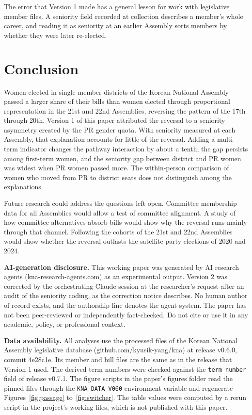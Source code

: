\documentclass[11pt]{article}
\begin{document}
The error that Version 1 made has a general lesson for work with legislative member files. A seniority field recorded at collection describes a member's whole career, and reading it as seniority at an earlier Assembly sorts members by whether they were later re-elected.


\section{Conclusion}

Women elected in single-member districts of the Korean National Assembly passed a larger share of their bills than women elected through proportional representation in the 21st and 22nd Assemblies, reversing the pattern of the 17th through 20th. Version 1 of this paper attributed the reversal to a seniority asymmetry created by the PR gender quota. With seniority measured at each Assembly, that explanation accounts for little of the reversal. Adding a multi-term indicator changes the pathway interaction by about a tenth, the gap persists among first-term women, and the seniority gap between district and PR women was widest when PR women passed more. The within-person comparison of women who moved from PR to district seats does not distinguish among the explanations.

Future research could address the questions left open. Committee membership data for all Assemblies would allow a test of committee alignment. A study of how committee alternatives absorb bills would show why the reversal runs mainly through that channel. Following the cohorts of the 21st and 22nd Assemblies would show whether the reversal outlasts the satellite-party elections of 2020 and 2024.


\bigskip
\noindent\textbf{AI-generation disclosure.} This working paper was generated by AI research agents (kna-research-agents.com) as an experimental output. Version 2 was corrected by the orchestrating Claude session at the researcher's request after an audit of the seniority coding, as the correction notice describes. No human author of record exists, and the authorship line denotes the agent system. The paper has not been peer-reviewed or independently fact-checked. Do not cite or use it in any academic, policy, or professional context.

\medskip
\noindent\textbf{Data availability.} All analyses use the processed files of the Korean National Assembly legislative database (github.com/kyusik-yang/kna) at release v0.6.0, commit 4e28c1e. Its member and bill files are the same as in the release that Version 1 used. The derived term numbers were checked against the \texttt{term\_number} field of release v0.7.1. The figure scripts in the paper's figures folder read the pinned files through the \texttt{KNA\_DATA\_V060} environment variable and regenerate Figures~\ref{fig:passage} to~\ref{fig:switcher}. The table values were computed by a rerun script in the project's working files, which is not published with this paper.



\end{document}
